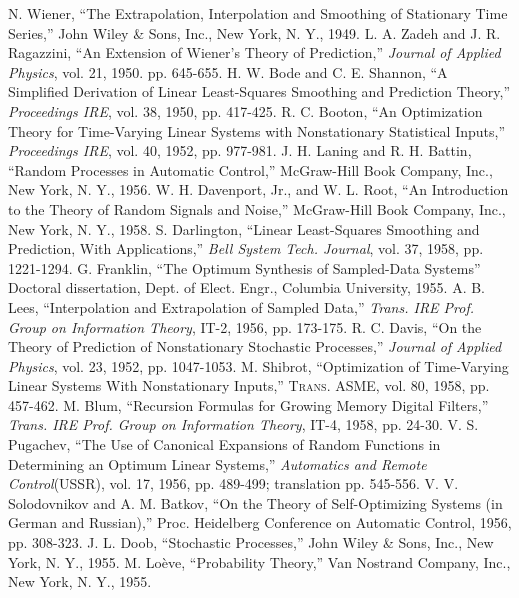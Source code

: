 \documentclass[UTF8,adobefonts]{ctexart}
\begin{document}
\begin{thebibliography}{0}
 N. Wiener, ``The Extrapolation, Interpolation and Smoothing of Stationary Time Series,'' John Wiley \& Sons, Inc., New York, N. Y., 1949.
 L. A. Zadeh and J. R. Ragazzini, ``An Extension of Wiener's Theory of Prediction,'' \textit{Journal of Applied Physics}, vol. 21, 1950. pp. 645-655.
 H. W. Bode and C. E. Shannon, ``A Simplified Derivation of Linear Least-Squares Smoothing and Prediction Theory,'' \textit{Proceedings IRE}, vol. 38, 1950, pp. 417-425.
 R. C. Booton, ``An Optimization Theory for Time-Varying Linear Systems with Nonstationary Statistical Inputs,'' \textit{Proceedings IRE}, vol. 40, 1952, pp. 977-981.
 J. H. Laning and R. H. Battin, ``Random Processes in Automatic Control,'' McGraw-Hill Book Company, Inc., New York, N. Y., 1956.
 W. H. Davenport, Jr., and W. L. Root, ``An Introduction to the Theory of Random Signals and Noise,'' McGraw-Hill Book Company, Inc., New York, N. Y., 1958.
 S. Darlington, ``Linear Least-Squares Smoothing and Prediction, With Applications,'' \textit{Bell System Tech. Journal}, vol. 37, 1958, pp. 1221-1294.
 G. Franklin, ``The Optimum Synthesis of Sampled-Data Systems'' Doctoral dissertation, Dept. of Elect. Engr., Columbia University, 1955.
 A. B. Lees, ``Interpolation and Extrapolation of Sampled Data,'' \textit{Trans. IRE Prof. Group on Information Theory}, IT-2, 1956, pp. 173-175.
 R. C. Davis, ``On the Theory of Prediction of Nonstationary Stochastic Processes,'' \textit{Journal of Applied Physics}, vol. 23, 1952, pp. 1047-1053.
 M. Shibrot, ``Optimization of Time-Varying Linear Systems With Nonstationary Inputs,'' \textsc{Trans. ASME}, vol. 80, 1958, pp. 457-462.
 M. Blum, ``Recursion Formulas for Growing Memory Digital Filters,'' \textit{Trans. IRE Prof. Group on Information Theory}, IT-4, 1958, pp. 24-30.
 V. S. Pugachev, ``The Use of Canonical Expansions of Random Functions in Determining an Optimum Linear Systems,'' \textit{Automatics and Remote Control}(USSR), vol. 17, 1956, pp. 489-499; translation pp. 545-556.
 V. V. Solodovnikov and A. M. Batkov, ``On the Theory of Self-Optimizing Systems (in German and Russian),'' Proc. Heidelberg Conference on Automatic Control, 1956, pp. 308-323.
 J. L. Doob, ``Stochastic Processes,'' John Wiley \& Sons, Inc., New York, N. Y., 1955.
 M. Lo\`eve, ``Probability Theory,'' Van Nostrand Company, Inc., New York, N. Y., 1955.

\end{thebibliography}
\end{document}
